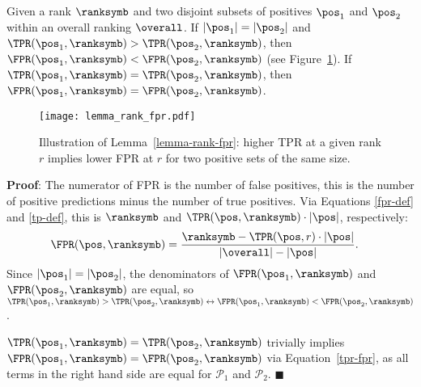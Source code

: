 \begin{lemma} \label{lemma-rank-fpr}
Given a rank $\ranksymb$ and two disjoint subsets of positives $\pos_1$ and $\pos_2$ within an overall ranking $\overall$. If $|\pos_1|=|\pos_2|$ and $\TPR(\pos_1, \ranksymb) > \TPR(\pos_2,\ranksymb)$, then $\FPR(\pos_1,\ranksymb) < \FPR(\pos_2,\ranksymb)$ (see Figure~\ref{fig:lemma-rank-fpr}). If $\TPR(\pos_1, \ranksymb) = \TPR(\pos_2,\ranksymb)$, then $\FPR(\pos_1, \ranksymb) = \FPR(\pos_2,\ranksymb)$.

\begin{figure}[!h]
  \centering
  \texttt{[image: lemma\_rank\_fpr.pdf]}
  \caption{Illustration of Lemma~\ref*{lemma-rank-fpr}: higher TPR at a given rank $r$ implies lower FPR at $r$ for two positive sets of the same size.}
  \label{fig:lemma-rank-fpr}
\end{figure}

\textbf{Proof}: The numerator of FPR is the number of false positives, this is the number of positive predictions minus the number of true positives. Via Equations \eqref{fpr-def} and \eqref{tp-def}, this is $\ranksymb$ and $\TPR(\pos,\ranksymb)\cdot|\pos|$, respectively:
\begin{align}
\FPR(\pos, \ranksymb) &= \frac{\ranksymb - \TPR(\pos, r) \cdot |\pos|}{|\overall|-|\pos|} \label{tpr-fpr}.
\end{align}
Since $|\pos_1|=|\pos_2|$, the denominators of $\FPR(\pos_1,\ranksymb)$ and $\FPR(\pos_2,\ranksymb)$ are equal, so $\TPR(\pos_1,\ranksymb)>\TPR(\pos_2,\ranksymb) \leftrightarrow \FPR(\pos_1,\ranksymb) < \FPR(\pos_2,\ranksymb)$.

$\TPR(\pos_1, \ranksymb) = \TPR(\pos_2,\ranksymb)$ trivially implies $\FPR(\pos_1, \ranksymb) = \FPR(\pos_2,\ranksymb)$ via Equation~\ref{tpr-fpr}, as all terms in the right hand side are equal for $\mathcal{P}_1$ and $\mathcal{P}_2$. \hfill$\blacksquare$
\end{lemma}



